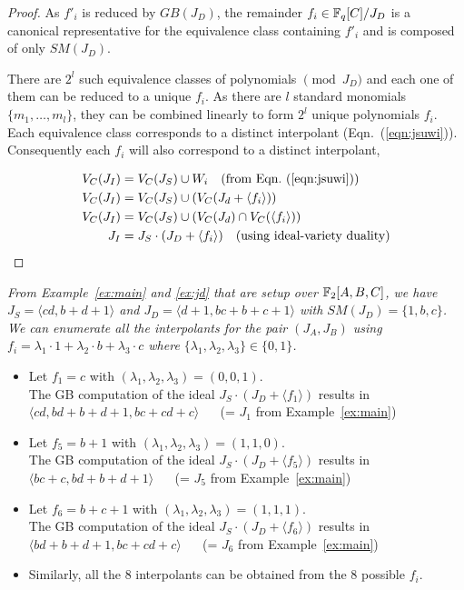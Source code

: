 \begin{proof}
As $f'_i$ is reduced by 
$GB(J_D)$, the remainder $f_i \in {\mathbb{F}}_{q}[C]/J_D$ is a canonical representative 
for the equivalence class containing
$f'_i$ and is composed of only $SM(J_D)$. 

\par There are $2^l$ such equivalence classes of polynomials $\pmod{J_D}$ and each one of 
them can be reduced to a unique $f_i$. As there are $l$ standard monomials
$\{m_1,\dots,m_l\}$, they can be combined linearly to form $2^l$ unique polynomials $f_i$. 
Each equivalence class corresponds to a distinct interpolant (Eqn.~(\ref{eqn:jsuwi})). 
Consequently each $f_i$ will also correspond to a distinct interpolant,

\begin{align*}
{V_C}(J_I) &= {V_C}(J_S) \cup W_i ~~~(\text{from Eqn.~(\ref{eqn:jsuwi})}) \\
{V_C}(J_I) &= {V_C}(J_S) \cup ({V_C}(J_d+\langle f_i \rangle)) \\
{V_C}(J_I) &= {V_C}(J_S) \cup ({V_C}(J_d)\cap {V_C}(\langle f_i \rangle)) \\
J_I &= J_S \cdot (J_D + \langle f_i \rangle) ~~~ (\text{using ideal-variety duality})
\end{align*} 

\end{proof}

\begin{Example}
\label{ex:enuall}
{\it
From Example~\ref{ex:main} and \ref{ex:jd} that are setup over ${\mathbb{F}}_2[A,B,C]$, 
we have $J_S = \langle cd, b + d+ 1 \rangle$ 
and $J_D = \langle d+1,bc+b+c+1 \rangle$ with
$SM(J_D) = \{1,b,c\}$. We can enumerate all the interpolants for the pair $(J_A,J_B)$ using
$f_i = \lambda_1\cdot 1 + \lambda_2\cdot b + \lambda_3\cdot c$ 
where $\{\lambda_1,\lambda_2,\lambda_3\} \in \{0,1\}$. 
\begin{itemize}
	\item Let $f_1 = c$ with $(\lambda_1,\lambda_2,\lambda_3)=(0,0,1)$.\\
	The GB computation 
	of the ideal $J_S\cdot (J_D + \langle f_1 \rangle)$ results in 
	$\langle cd,bd+b+d+1,bc+cd+c \rangle$ ~~ (= $J_1$ from Example~\ref{ex:main}) 
	\item Let $f_5 = b+1$ with $(\lambda_1,\lambda_2,\lambda_3)=(1,1,0)$. \\
	The GB computation 
	of the ideal $J_S\cdot (J_D + \langle f_5 \rangle)$ results in 
	$\langle bc+c,bd+b+d+1 \rangle$ ~~ (= $J_5$ from Example~\ref{ex:main})
	\item Let $f_6 = b+c+1$ with $(\lambda_1,\lambda_2,\lambda_3)=(1,1,1)$. \\
	The GB computation 
	of the ideal $J_S\cdot (J_D + \langle f_6 \rangle)$ results in 
	$\langle bd+b+d+1,bc+cd+c \rangle$ ~~ (= $J_6$ from Example~\ref{ex:main})
	\item Similarly, all the 8 interpolants can be obtained from the
	8 possible $f_i$.
\end{itemize}
}
\end{Example}

